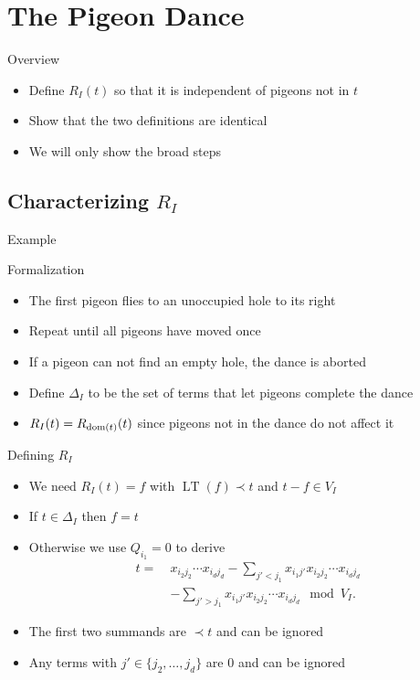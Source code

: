 \documentclass[xcolor={dvipsnames}, aspectratio=169, handout]{beamer}
\newcommand{\LT}{\operatorname{LT}}
\begin{document}
\section{The Pigeon Dance}
\begin{frame}{Overview}
    \begin{itemize}[<+->]
        \item Define $R_I(t)$ so that it is independent of pigeons not in $t$
        \item Show that the two definitions are identical
        \item We will only show the broad steps
    \end{itemize}
\end{frame}

\subsection{Characterizing \texorpdfstring{$R_I$}{RI}}
\begin{frame}{Example}
    
\end{frame}

\begin{frame}{Formalization}
    \begin{itemize}[<+->]
        \item The first pigeon flies to an unoccupied hole to its right
        \item Repeat until all pigeons have moved once
        \item If a pigeon can not find an empty hole, the dance is aborted
        \item Define $\Delta_I$ to be the set of terms that let pigeons complete the dance
        \item $R_I(t) = R_{\operatorname{dom}(t)}(t)$ since pigeons not in the dance do not affect it
    \end{itemize}
\end{frame}

\begin{frame}{Defining $R_I$}
    \begin{itemize}[<+->]
        \item We need $R_I(t) = f$ with $\LT(f) \prec t$ and $t - f \in V_I$
        \item If $t \in \Delta_I$ then $f = t$
        \item Otherwise we use $Q_{i_1} = 0$ to derive
            \begin{align*}
                t = \ &x_{i_2 j_2} \cdots x_{i_d j_d} - \sum_{j' < j_1} x_{i_1 j'} x_{i_2 j_2} \cdots x_{i_d j_d}\\
                &- \sum_{j' > j_1} x_{i_1 j'} x_{i_2 j_2} \cdots x_{i_d j_d} \mod V_I.
            \end{align*}
        \item The first two summands are $\prec t$ and can be ignored
        \item Any terms with $j' \in \{j_2, \ldots, j_d\}$ are $0$ and can be ignored
    \end{itemize}
\end{frame}
\end{document}

